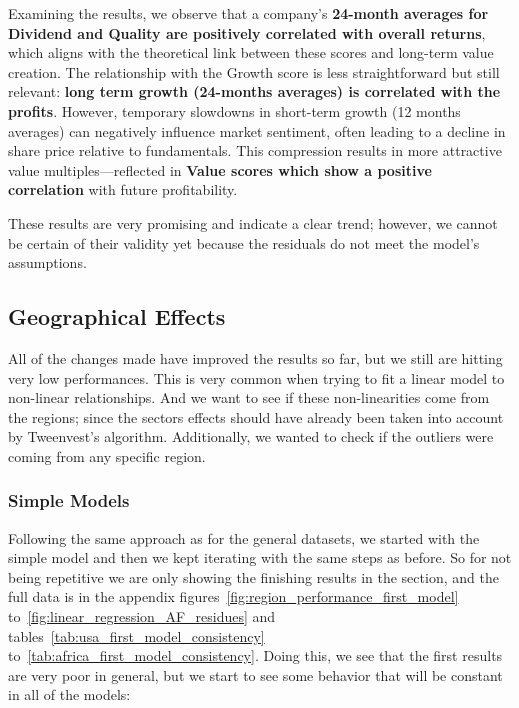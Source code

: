 \documentclass[11pt,english,a4paper,hidelinks]{book}
\begin{document}
\noindent Examining the results, we observe that a company's \textbf{24-month averages for Dividend and Quality are positively correlated with overall returns}, which aligns with the theoretical link between these scores and long-term value creation. The relationship with the Growth score is less straightforward but still relevant: \textbf{long term growth (24-months averages) is correlated with the profits}. However, temporary slowdowns in short-term growth (12 months averages) can negatively influence market sentiment, often leading to a decline in share price relative to fundamentals. This compression results in more attractive value multiples—reflected in \textbf{Value scores which show a positive correlation} with future profitability.

\noindent These results are very promising and indicate a clear trend; however, we cannot be certain of their validity yet because the residuals do not meet the model's assumptions.

\subsection{Geographical Effects}

\noindent All of the changes made have improved the results so far, but we still are hitting very low performances. This is very common when trying to fit a linear model to non-linear relationships. And we want to see if these non-linearities come from the regions; since the sectors effects should have already been taken into account by Tweenvest's algorithm. Additionally, we wanted to check if the outliers were coming from any specific region.

\subsubsection{Simple Models}

\noindent Following the same approach as for the general datasets, we started with the simple model and then we kept iterating with the same steps as before. So for not being repetitive we are only showing the finishing results in the section, and the full data is in the appendix figures~\ref{fig:region_performance_first_model} to~\ref{fig:linear_regression_AF_residues} and tables~\ref{tab:usa_first_model_consistency} to~\ref{tab:africa_first_model_consistency}. Doing this, we see that the first results are very poor in general, but we start to see some behavior that will be constant in all of the models:
\end{document}
